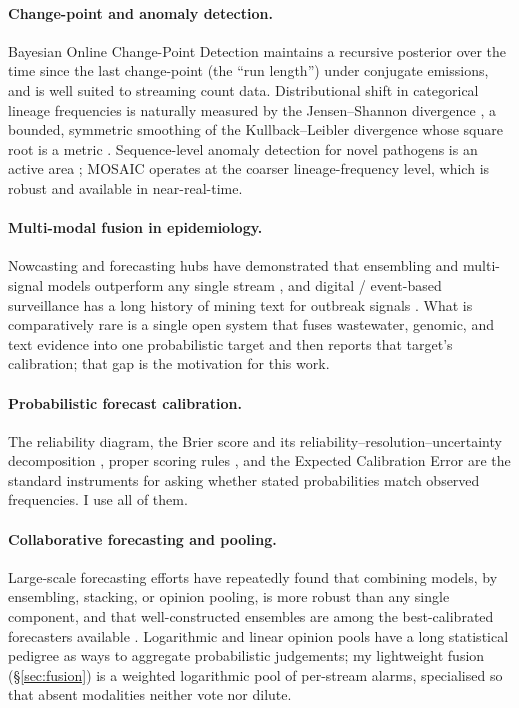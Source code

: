 \documentclass[10pt,twocolumn]{article}
\theoremstyle{definition}
\begin{document}
\paragraph{Change-point and anomaly detection.}
Bayesian Online Change-Point Detection \citep{adams2007} maintains a recursive
posterior over the time since the last change-point (the ``run length'') under
conjugate emissions, and is well suited to streaming count data. Distributional
shift in categorical lineage frequencies is naturally measured by the
Jensen--Shannon divergence \citep{lin1991}, a bounded, symmetric smoothing of the
Kullback--Leibler divergence whose square root is a metric \citep{endres2003}.
Sequence-level anomaly detection for novel pathogens is an active area
\citep{metagene2024}; MOSAIC operates at the coarser lineage-frequency level,
which is robust and available in near-real-time.

\paragraph{Multi-modal fusion in epidemiology.}
Nowcasting and forecasting hubs have demonstrated that ensembling and
multi-signal models outperform any single stream \citep{cramer2022}, and digital
/ event-based surveillance has a long history of mining text for outbreak
signals \citep{brownstein2009,carlson2023}. What is comparatively rare is a
single open system that fuses wastewater, genomic, and text evidence into one
probabilistic target and then reports that target's calibration; that gap is the
motivation for this work.

\paragraph{Probabilistic forecast calibration.}
The reliability diagram, the Brier score and its reliability--resolution--uncertainty
decomposition \citep{brier1950,murphy1973}, proper scoring rules
\citep{gneiting2007}, and the Expected Calibration Error \citep{guo2017} are the
standard instruments for asking whether stated probabilities match observed
frequencies. I use all of them.

\paragraph{Collaborative forecasting and pooling.}
Large-scale forecasting efforts have repeatedly found that combining models, by
ensembling, stacking, or opinion pooling, is more robust than any single
component, and that well-constructed ensembles are among the best-calibrated
forecasters available \citep{cramer2022}. Logarithmic and linear opinion pools
have a long statistical pedigree as ways to aggregate probabilistic judgements;
my lightweight fusion (\S\ref{sec:fusion}) is a weighted logarithmic pool of
per-stream alarms, specialised so that absent modalities neither vote nor dilute.
\end{document}
